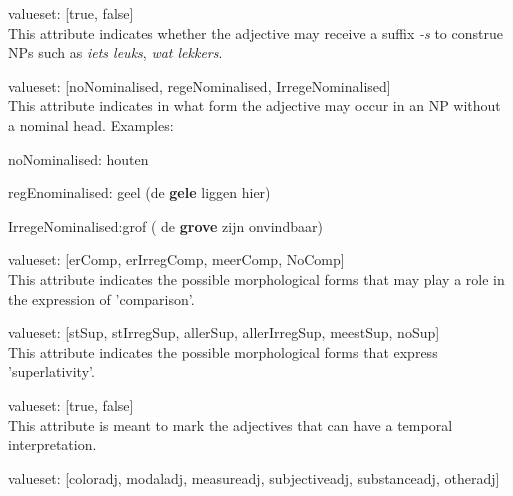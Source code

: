 \begin{description}
\newpage
\item [sFormation]\mbox{}

valueset: [true, false]\\

This attribute indicates whether the adjective may receive a suffix {\em -s}
to construe NPs such as {\em iets leuks}, {\em wat lekkers}.
\newpage
\item 
[eNominalised] \mbox{}

valueset: [noNominalised, regeNominalised, IrregeNominalised]\\

This attribute indicates in what form the adjective may occur in an NP 
without a 
nominal head. Examples:\\
\begin{description}
  \item noNominalised: houten
  \item regEnominalised: geel (de {\bf gele} liggen hier) 
  \item IrregeNominalised:grof ( de {\bf grove} zijn onvindbaar)
\end{description}


\newpage
\item 
[comparatives] \mbox{}

 valueset: [erComp, erIrregComp, meerComp, NoComp]\\

This attribute indicates the possible morphological forms that 
may play a role in the expression of  'comparison'.


\newpage
\item 
[superlatives]\mbox{}

  valueset: [stSup, stIrregSup, allerSup, allerIrregSup, 
                           meestSup, noSup]\\

This attribute indicates the possible morphological forms that 
express 'superlativity'.

\newpage
\item
[temporal]\mbox{}
      valueset: [true, false]\\

This attribute is meant to mark the adjectives
that can have a temporal interpretation.

\newpage
\item
[subcs]\mbox{}

         valueset: [coloradj, modaladj, measureadj, subjectiveadj,
                          substanceadj, otheradj]\\


\end{description}
